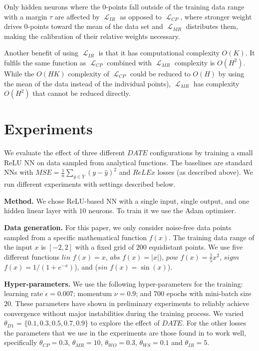 \documentclass[runningheads]{llncs}
\DeclareMathOperator{\Lagr}{\mathcal{L}}
\begin{document}
Only hidden neurons where the 0-points fall outside of the training data range with a margin $\tau$ are affected by $\Lagr_{IR}$ as opposed to $\Lagr_{CP}$, where stronger weight drives 0-points toward the mean of the data set and $\Lagr_{MR}$ distributes them, making the calibration of their relative weights necessary. 

Another benefit of using $\Lagr_{IR}$ is that it has computational complexity $O(K)$. 
It fulfils the same function as $\Lagr_{CP}$ combined with $\Lagr_{MR}$ complexity is $O(H^2)$. While the $O(H K)$ complexity of $\Lagr_{CP}$ could be reduced to $O(H)$ by using the mean of the data instead of the individual points), 
$\Lagr_{MR}$ has complexity $O(H^2)$ that cannot be reduced directly. 

\section{Experiments}\label{sec-experiments}

We evaluate the effect of three different $DATE$ configurations by training a small ReLU NN on data sampled from analytical functions. 
The baselines are standard NNs with $MSE = \frac{1}{n}\sum_{y \in Y} (y - \hat{y})^2$ 
 and $ReLEx$ losses (as described above).
We run different experiments with settings described below.

\textbf{Method.}
We chose ReLU-based NN with a single input, single output, and one hidden linear layer with $10$ neurons. To train it we use the Adam optimiser.

\textbf{Data generation.}
For this paper, we only consider noise-free data points sampled from a specific mathematical function $f(x)$. 
The training data range of the input $x$ is $[-2, 2]$ with a fixed grid of $200$ equidistant points. 
We use five different functions $lin$ $f(x) = x$, $abs$ $f(x) = |x|$), $pow$ $f(x) = \frac{1}{5}x^2$, $sigm$ $f(x) = 1 / (1 + e^{-x})$), and ($sin$ $f(x) = \sin(x)$). 

\textbf{Hyper-parameters.}
We use the following hyper-parameters for the training: learning rate $\epsilon = 0.007$; momentum $\nu = 0.9$; and $700$ epochs with mini-batch size $20$. These parameters have shown in preliminary experiments to reliably achieve convergence without major instabilities during the training process.
We varied $\theta_{D1}$ = $\{0.1,0.3,0.5,0.7,0.9\}$ to explore the effect of $DATE$.
For the other losses the parameters that we use in the experiments are those found in \cite{Lopedoto20} to work well, specifically $\theta_{CP} = 0.3$, $\theta_{MR} = 10$, $\theta_{WO} = 0.3$, $\theta_{WS} = 0.1$ and $\theta_{IR} = 5$. 
\end{document}
